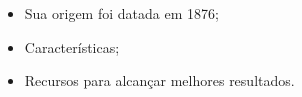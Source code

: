 \begin{itemize}
    \item<1> Sua origem foi datada em 1876;
    \item<1> Características;
    \item<1> Recursos para alcançar melhores resultados.
\end{itemize}